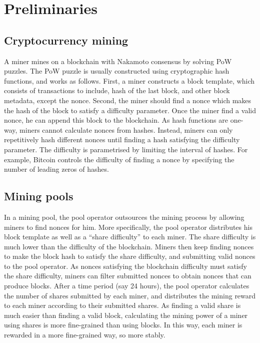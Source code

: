 \section{Preliminaries}

\subsection{Cryptocurrency mining}


A miner mines on a blockchain with Nakamoto consensus by solving PoW puzzles.
The PoW puzzle is usually constructed using cryptographic hash functions, and works as follows.
First, a miner constructs a block template, which consists of transactions to include, hash of the last block, and other block metadata, except the nonce.
Second, the miner should find a nonce which makes the hash of the block to satisfy a difficulty parameter.
Once the miner find a valid nonce, he can append this block to the blockchain.
As hash functions are one-way, miners cannot calculate nonces from hashes.
Instead, miners can only repetitively hash different nonces until finding a hash satisfying the difficulty parameter.
The difficulty is parametrised by limiting the interval of hashes.
For example, Bitcoin controls the difficulty of finding a nonce by specifying the number of leading zeros of hashes.





\subsection{Mining pools}

In a mining pool, the pool operator outsources the mining process by allowing miners to find nonces for him.
More specifically, the pool operator distributes his block template as well as a ``share difficulty'' to each miner.
The share difficulty is much lower than the difficulty of the blockchain.
Miners then keep finding nonces to make the block hash to satisfy the share difficulty, and submitting valid nonces to the pool operator.
As nonces satisfying the blockchain difficulty must satisfy the share difficulty, miners can filter submitted nonces to obtain nonces that can produce blocks.
After a time period (say 24 hours), the pool operator calculates the number of shares submitted by each miner, and distributes the mining reward to each miner according to their submitted shares.
As finding a valid share is much easier than finding a valid block, calculating the mining power of a miner using shares is more fine-grained than using blocks.
In this way, each miner is rewarded in a more fine-grained way, so more stably.




